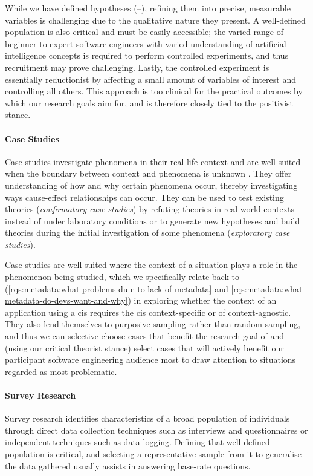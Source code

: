 While we have defined hypotheses (--), refining them into precise, measurable variables is challenging due to the qualitative nature they present. A well-defined population is also critical and must be easily accessible; the varied range of beginner to expert software engineers with varied understanding of artificial intelligence concepts is required to perform controlled experiments, and thus recruitment may prove challenging. Lastly, the controlled experiment is essentially reductionist by affecting a small amount of variables of interest and controlling all others. This approach is too clinical for the practical outcomes by which our research goals aim for, and is therefore closely tied to the positivist stance.

\paragraph{Case Studies}
Case studies investigate phenomena in their real-life context and are well-suited when the boundary between context and phenomena is unknown \citep{Yin:2017tf}. They offer understanding of how and why certain phenomena occur, thereby investigating ways cause-effect relationships can occur. They can be used to test existing theories (\textit{confirmatory case studies}) by refuting theories in real-world contexts instead of under laboratory conditions or to generate new hypotheses and build theories during the initial investigation of some phenomena (\textit{exploratory case studies}).

Case studies are well-suited where the context of a situation plays a role in the phenomenon being studied, which we specifically relate back to  (\ref{rqs:metadata:what-problems-du                                                                e-to-lack-of-metadata} and \ref{rqs:metadata:what-metadata-do-devs-want-and-why}) in exploring whether the context of an application using a \gls{cis} requires the \gls{cis} context-specific or of context-agnostic. They also lend themselves to purposive sampling rather than random sampling, and thus we can selective choose cases that benefit the research goal of  and (using our critical theorist stance) select cases that will actively benefit our participant software engineering audience most to draw attention to situations regarded as most problematic.

\paragraph{Survey Research}
Survey research identifies characteristics of a broad population of individuals through direct data collection techniques such as interviews and questionnaires or independent techniques such as data logging. Defining that well-defined population is critical, and selecting a representative sample from it to generalise the data gathered usually assists in answering base-rate questions.

